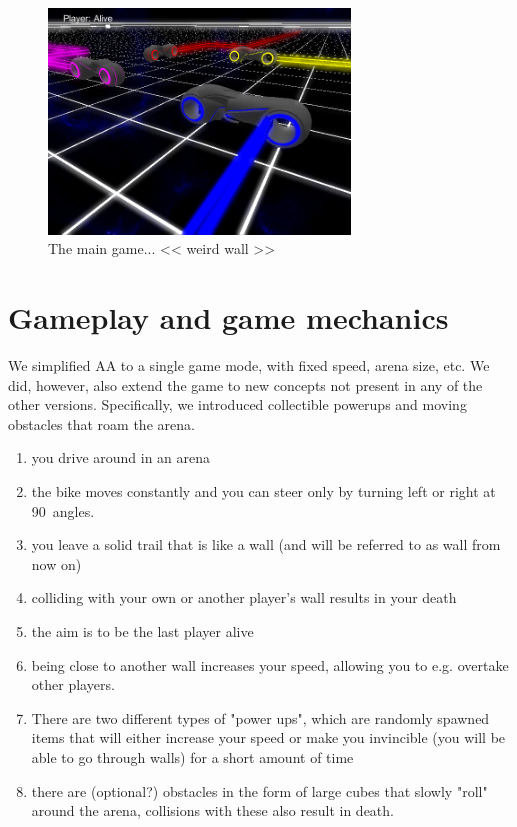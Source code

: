 \documentclass{report}
\begin{document}
\begin{figure}
 	 	    \includegraphics[height=6cm]{tron_four}
 	  
 	 	\caption{The main game... << weird wall >> }
 \end{figure}
 
\section{Gameplay and game mechanics }
We simplified AA to a single game mode, with fixed speed, arena size, etc.
We did, however, also extend the game to new concepts not present in any of the other versions. Specifically, we introduced collectible powerups and moving obstacles that roam the arena.

\begin{enumerate}
  \item you drive around in an arena
  \item the bike moves constantly and you can steer only by turning left or right at 90\textdegree \ angles.
  \item you leave a solid trail that is like a wall (and will be referred to as wall from now on)
  \item colliding with your own or another player's wall results in your death
  \item the aim is to be the last player alive
  \item being close to another wall increases your speed, allowing you to e.g. overtake other players.
  \item There are two different types of "power ups", which are randomly spawned items that will either increase your speed or make you invincible (you will be able to go through walls) for a short amount of time
  \item there are (optional?) obstacles in the form of large cubes that slowly "roll" around the arena, collisions with these also result in death.
 
\end{enumerate}
\end{document}
